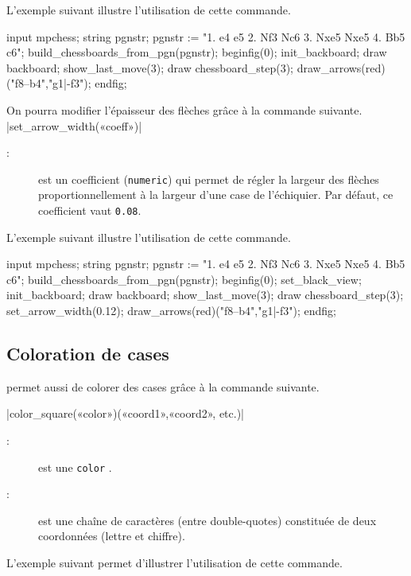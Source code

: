 \documentclass[french]{ltxdoc}
\begin{document}
L’exemple suivant illustre l’utilisation de cette commande.
\begin{ExempleMP}
input mpchess;
string pgnstr;
pgnstr := "1. e4 e5 2. Nf3 Nc6 3. Nxe5 Nxe5 4. Bb5 c6";
build_chessboards_from_pgn(pgnstr);
beginfig(0);
init_backboard;
draw backboard;
show_last_move(3);
draw chessboard_step(3); %
draw_arrows(red)("f8--b4","g1|-f3");
endfig;
\end{ExempleMP}

On pourra modifier l’épaisseur des flèches grâce à la commande suivante.
\commande|set_arrow_width(«coeff»)|\smallskip

\begin{description}
  \item[:] est un coefficient (\lstinline+numeric+) qui permet de
  régler la largeur des flèches proportionnellement à la largeur d’une case de
  l’échiquier. Par défaut, ce coefficient vaut \lstinline+0.08+.
\end{description}

L’exemple suivant illustre l’utilisation de cette commande.
\begin{ExempleMP}
input mpchess;
string pgnstr;
pgnstr := "1. e4 e5 2. Nf3 Nc6 3. Nxe5 Nxe5 4. Bb5 c6";
build_chessboards_from_pgn(pgnstr);
beginfig(0);
set_black_view;
init_backboard;
draw backboard;
show_last_move(3);
draw chessboard_step(3); %
set_arrow_width(0.12);
draw_arrows(red)("f8--b4","g1|-f3");
endfig;
\end{ExempleMP}


\subsection{Coloration de cases}
\mpchess permet aussi de colorer des cases grâce à la commande suivante.

\commande|color_square(«color»)(«coord1»,«coord2», etc.)|\smallskip

\begin{description}
\item[:] est une \lstinline+color+ \MP.
\item[:] est une chaîne de caractères (entre double-quotes) constituée de deux coordonnées (lettre et chiffre).
\end{description}

L’exemple suivant permet d’illustrer l’utilisation de cette commande.
\end{document}
